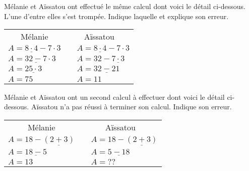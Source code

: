 \begin{activite}

 \begin{partie}
Mélanie et Aïssatou ont effectué le même calcul dont voici le détail ci-dessous. L'une d'entre elles s'est trompée. Indique laquelle et explique son erreur. 

\vspace{1em}

\begin{center}
 \begin{tabularx}{.6\linewidth}{X|cX}
  \multicolumn{1}{c|}{Mélanie} & \multicolumn{2}{c}{Aïssatou} \\
  $A = \underline{8 \cdot 4} - 7 \cdot 3$ && $A = \underline{8 \cdot 4} - 7 \cdot 3$ \\
  $A = \underline{32 - 7} \cdot 3$ && $A = 32 - \underline{7 \cdot 3}$ \\
  $A = \underline{25 \cdot 3}$ && $A = \underline{32 - 21}$ \\
  $A = 75$ && $A = 11$ \\
  \end{tabularx}
\end{center}

\end{partie}


\begin{partie}
Mélanie et Aïssatou ont un second calcul à effectuer dont voici le détail ci-dessous. Aïssatou n'a pas réussi à terminer son calcul. Indique son erreur.

\vspace{1em}

\begin{center}
 \begin{tabularx}{.6\linewidth}{X|cX}
  \multicolumn{1}{c|}{Mélanie} & \multicolumn{2}{c}{Aïssatou} \\
  $A = 18 - \underline{(2 + 3)}$ && $A = 18 - \underline{(2 + 3)}$ \\
  $A = \underline{18 - 5}$ && $A = \underline{5 - 18}$ \\
  $A = 13$ && $A = ??$ \\
  \end{tabularx}
\end{center}

\end{partie}

\end{activite}



